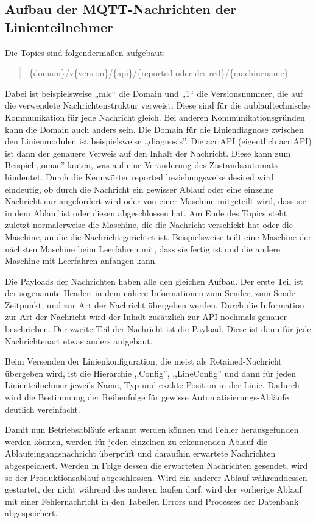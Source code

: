 \subsection{Aufbau der MQTT-Nachrichten der Linienteilnehmer}
Die Topics sind folgendermaßen aufgebaut:
 \begin{quote}
\{domain\}/v\{version\}/\{api\}/\{reported oder desired\}/\{machinename\}
\end{quote}

Dabei ist beispielsweise „mlc“ die Domain und „1“ die Versionsnummer, die auf die verwendete Nachrichtenstruktur verweist.
Diese sind für die aublauftechnische Kommunikation für jede Nachricht gleich. 
Bei anderen Kommunikationsgründen kann die Domain auch anders sein. Die Domain für die Liniendiagnose zwischen den Linienmodulen ist beispielsweise ,,diagnosis''.
Die \acrshort{acr:API} (eigentlich \acrlong{acr:API}) ist dann der genauere Verweis auf den Inhalt der Nachricht. 
Diese kann zum Beispiel ,,omac'' lauten, was auf eine Veränderung des Zustandsautomats hindeutet.
Durch die Kennwörter reported beziehungsweise desired wird eindeutig, ob durch die Nachricht ein gewisser Ablauf oder eine einzelne Nachricht nur angefordert wird oder von einer Maschine mitgeteilt wird, dass sie in dem Ablauf ist oder diesen abgeschlossen hat.
Am Ende des Topics steht zuletzt normalerweise die Maschine, die die Nachricht verschickt hat oder die Maschine, an die die Nachricht gerichtet ist. Beispielsweise teilt eine Maschine der nächsten Maschine beim Leerfahren mit, dass sie fertig ist und die andere Maschine mit Leerfahren anfangen kann.

Die Payloads der Nachrichten haben alle den gleichen Aufbau. Der erste Teil ist der sogenannte Header, in dem nähere Informationen zum Sender, zum Sende-Zeitpunkt, und zur Art der Nachricht übergeben werden. Durch die Information zur Art der Nachricht wird der Inhalt zusätzlich zur API nochmals genauer beschrieben.
Der zweite Teil der Nachricht ist die Payload. Diese ist dann für jede Nachrichtenart etwas anders aufgebaut.

Beim Versenden der Linienkonfiguration, die meist als Retained-Nachricht übergeben wird, ist die Hierarchie ,,Config'', ,,LineConfig'' und dann für jeden Linienteilnehmer jeweils Name, Typ und exakte Position in der Linie. Dadurch wird die Bestimmung der Reihenfolge für gewisse Automatisierungs-Abläufe deutlich vereinfacht. 

Damit nun Betriebsabläufe erkannt werden können und Fehler herausgefunden werden können, werden für jeden einzelnen zu erkennenden Ablauf die Ablaufeingangsnachricht überprüft und daraufhin erwartete Nachrichten abgespeichert. Werden in Folge dessen die erwarteten Nachrichten gesendet, wird so der Produktionsablauf abgeschlossen. Wird ein anderer Ablauf währenddessen gestartet, der nicht während des anderen laufen darf, wird der vorherige Ablauf mit einer Fehlernachricht in den Tabellen Errors und Processes der Datenbank abgespeichert. 


